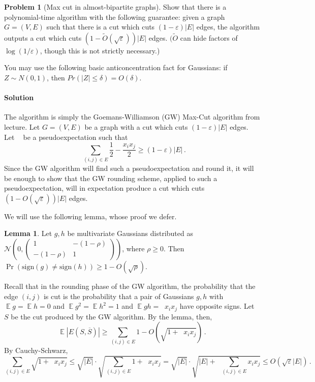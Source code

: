 \documentclass[11pt]{article}
\theoremstyle{definition}
\newtheorem{problem}[theorem]{Problem}
\newtheorem*{lemma*}{Lemma}
\renewcommand{\epsilon}{\varepsilon}
\newcommand{\eps}{\epsilon}
\newcommand{\cN}{\mathcal{N}}
\DeclareMathOperator{\E}{\mathbb{E}} %
\DeclareMathOperator{\pE}{\widetilde{\mathbb{E}}} %
\begin{document}
\begin{problem}[Max cut in almost-bipartite graphs]
Show that there is a polynomial-time algorithm with the following guarantee: given a graph $G = (V,E)$ such that there is a cut which cuts $(1-\epsilon)|E|$ edges, the algorithm outputs a cut which cuts $(1-\tilde{O}(\sqrt{\epsilon}))|E|$ edges. $(\tilde{O}$ can hide factors of $\log(1/\epsilon)$, though this is not strictly necessary.)

You may use the following basic anticoncentration fact for Gaussians: if $Z \sim N(0,1)$, then $Pr(|Z| \leq \delta) = O(\delta)$.
\end{problem}

\paragraph{Solution}
The algorithm is simply the Goemans-Williamson (GW) Max-Cut algorithm from lecture.
Let $G = (V,E)$ be a graph with a cut which cuts $(1-\eps)|E|$ edges.
Let $\pE$ be a pseudoexpectation such that
\[
\pE \sum_{(i,j) \in E} \frac 12 - \frac{x_i x_j}{2} \geq (1-\eps) |E| \, .
\]
Since the GW algorithm will find such a pseudoexpectation and round it, it will be enough to show that the GW rounding scheme, applied to such a pseudoexpectation, will in expectation produce a cut which cuts $(1 - O(\sqrt{\eps}))|E|$ edges.

We will use the following lemma, whose proof we defer.

\begin{lemma*}
Let $g,h$ be  multivariate Gaussians distributed as $\cN \left ( 0, \left ( \begin{matrix} 1 & -(1-\rho) \\ -(1-\rho) & 1 \end{matrix} \right ) \right ) $, where $\rho \geq 0$.
Then $\Pr( \text{sign}(g) \neq \text{sign}(h)) \geq 1 - O(\sqrt{\rho})$.
\end{lemma*}

Recall that in the rounding phase of the GW algorithm, the probability that the edge $(i,j)$ is cut is the probability that a pair of Gaussians $g,h$ with $\E g = \E h = 0$ and $\E g^2 = \E h^2 = 1$ and $\E gh = \pE x_i x_j$ have opposite signs.
Let $S$ be the cut produced by the GW algorithm.
By the lemma, then,
\[
  \E |E(S,\overline{S})| \geq \sum_{(i,j) \in E} 1 - O \left ( \sqrt{1 + \pE x_i x_j } \right ) \, .
\]
By Cauchy-Schwarz,
\[
  \sum_{(i,j) \in E} \sqrt{1+ \pE x_i x_j} \leq \sqrt{|E|} \cdot \sqrt{\sum_{(i,j) \in E} 1 + \pE x_i x_j} = \sqrt{|E|} \cdot \sqrt{|E| + \pE \sum_{(i,j) \in E} x_i x_j} \leq O(\sqrt{\eps} |E|) \, .
\]
\end{document}
